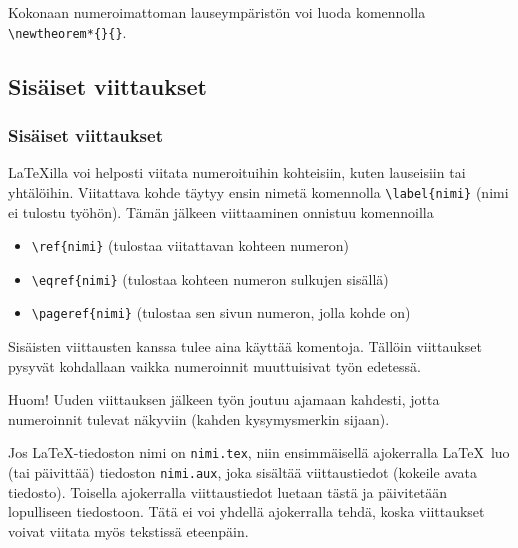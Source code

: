 \begin{frame}[fragile]
    Kokonaan numeroimattoman lauseympäristön voi luoda komennolla \verb-\newtheorem*{}{}-.
    
    
\end{frame}
\subsection{Sisäiset viittaukset}
\begin{frame}[fragile]
    \frametitle{Sisäiset viittaukset}
    \LaTeX illa voi helposti viitata numeroituihin kohteisiin, kuten lauseisiin tai yhtälöihin. Viitattava kohde täytyy ensin nimetä komennolla \verb-\label{nimi}- (nimi ei tulostu työhön). Tämän jälkeen viittaaminen onnistuu komennoilla 
    \begin{itemize}
        \item \verb-\ref{nimi}- (tulostaa viitattavan kohteen numeron)
        \item \verb-\eqref{nimi}- (tulostaa kohteen numeron sulkujen sisällä)
        \item \verb-\pageref{nimi}- (tulostaa sen sivun numeron, jolla kohde on)  
    \end{itemize}
    Sisäisten viittausten kanssa tulee aina käyttää komentoja. Tällöin viittaukset pysyvät kohdallaan vaikka numeroinnit muuttuisivat työn edetessä.
\end{frame}
\begin{frame}[fragile]
    Huom! Uuden viittauksen jälkeen työn joutuu ajamaan kahdesti, jotta numeroinnit tulevat näkyviin (kahden kysymysmerkin sijaan).
    \begin{extra}
        Jos \LaTeX-tiedoston nimi on \verb-nimi.tex-, niin ensimmäisellä ajokerralla \LaTeX\ luo (tai päivittää) tiedoston \verb-nimi.aux-, joka sisältää viittaustiedot (kokeile avata tiedosto). Toisella ajokerralla viittaustiedot luetaan tästä ja päivitetään lopulliseen tiedostoon. Tätä ei voi yhdellä ajokerralla tehdä, koska viittaukset voivat viitata myös tekstissä eteenpäin.
    \end{extra}
    
\end{frame}
